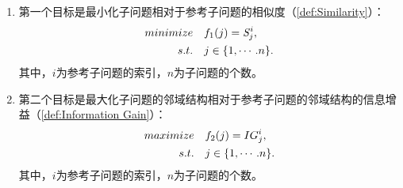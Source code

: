 \begin{enumerate}
    \item 第一个目标是最小化子问题相对于参考子问题的相似度（\autoref{def:Similarity}）：
    \begin{align}\label{eq:First objective}
        minimize \quad & f_1(j) = \mathit{S}^i_j,  \\
        s.t. \quad & j \in \{1, \cdots. n\}. \notag
    \end{align}
    其中，$i$为参考子问题的索引，$n$为子问题的个数。
    \item 第二个目标是最大化子问题的邻域结构相对于参考子问题的邻域结构的信息增益（\autoref{def:Information Gain}）：\begin{align}\label{eq:Second objective}
        maximize \quad & f_2(j) = IG^i_j,  \\
        s.t. \quad & j \in \{1, \cdots. n\}. \notag
    \end{align}
    其中，$i$为参考子问题的索引，$n$为子问题的个数。
\end{enumerate}

